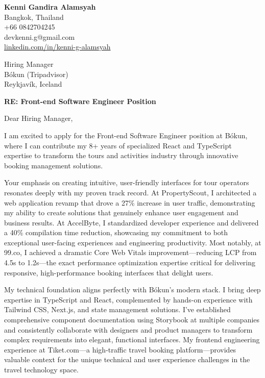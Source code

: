 \documentclass[11pt]{article}
\begin{document}
\begin{flushleft}
\textbf{Kenni Gandira Alamsyah}\\
Bangkok, Thailand\\
+66 0842704245\\
devkenni.g@gmail.com\\
\href{https://www.linkedin.com/in/kenni-g-alamsyah/}{linkedin.com/in/kenni-g-alamsyah}
\end{flushleft}

\vspace{1em}

\begin{flushleft}
Hiring Manager\\
Bókun (Tripadvisor)\\
Reykjavík, Iceland
\end{flushleft}

\vspace{1em}

\textbf{RE: Front-end Software Engineer Position}

\vspace{1em}

Dear Hiring Manager,

I am excited to apply for the Front-end Software Engineer position at Bókun, where I can contribute my 8+ years of specialized React and TypeScript expertise to transform the tours and activities industry through innovative booking management solutions.

Your emphasis on creating intuitive, user-friendly interfaces for tour operators resonates deeply with my proven track record. At PropertyScout, I architected a web application revamp that drove a 27\% increase in user traffic, demonstrating my ability to create solutions that genuinely enhance user engagement and business results. At AccelByte, I standardized developer experience and delivered a 40\% compilation time reduction, showcasing my commitment to both exceptional user-facing experiences and engineering productivity. Most notably, at 99.co, I achieved a dramatic Core Web Vitals improvement—reducing LCP from 4.5s to 1.2s—the exact performance optimization expertise critical for delivering responsive, high-performance booking interfaces that delight users.

My technical foundation aligns perfectly with Bókun's modern stack. I bring deep expertise in TypeScript and React, complemented by hands-on experience with Tailwind CSS, Next.js, and state management solutions. I've established comprehensive component documentation using Storybook at multiple companies and consistently collaborate with designers and product managers to transform complex requirements into elegant, functional interfaces. My frontend engineering experience at Tiket.com—a high-traffic travel booking platform—provides valuable context for the unique technical and user experience challenges in the travel technology space.
\end{document}
